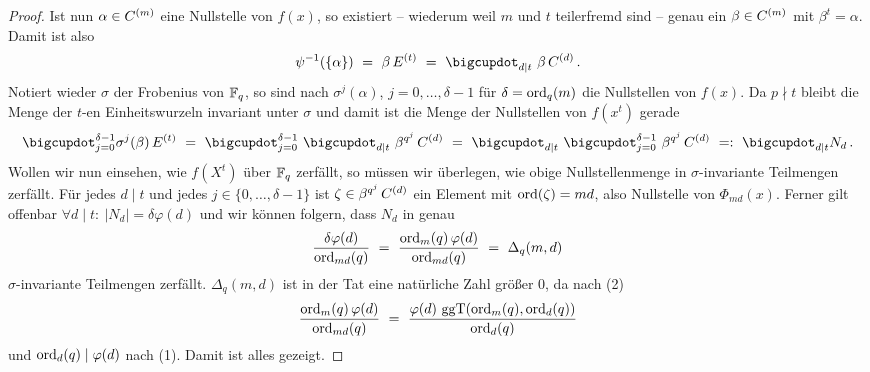 \begin{proof}
  Ist nun $\alpha \in C^{(m)}$ eine Nullstelle von $f(x)$, 
  so existiert -- wiederum
  weil $m$ und $t$ teilerfremd sind -- genau ein $\beta \in C^{(m)}$ mit
  $\beta^t = \alpha$. Damit ist also
  \[ \psi\inv(\{\alpha\}) \speq= \beta\, E\kl t \speq=
    \bigcupdot_{d\mid t}\ \beta\, C\kl d \,.\]
  Notiert wieder $\sigma$ der Frobenius von
  $\mathbb{F}_q$, so sind nach 
  $\sigma^j(\alpha)$, $j=0,\ldots,\delta-1$ für 
  $\delta=\operatorname{ord}_q(m)$ die Nullstellen von $f(x)$. Da $p\nmid t$ bleibt
  die Menge der $t$-en Einheitswurzeln invariant unter $\sigma $ und 
  damit ist die Menge der Nullstellen von $f(x^t)$ gerade
  \[ \bigcupdot_{j=0}^{\delta-1} \sigma^j(\beta)\, E\kl t \speq=
    \bigcupdot_{j=0}^{\delta-1}\ \bigcupdot_{d\mid t}\ \beta^{q^j}\, C\kl d
    \speq=
    \bigcupdot_{d\mid t}\ \bigcupdot_{j=0}^{\delta-1}\ \beta^{q^j}\, C\kl d
    \speq{=:} \bigcupdot_{d\mid t} N_d\,. \]
  Wollen wir nun einsehen, wie $f(X^t)$ über $\mathbb{F}_q$ zerfällt, so müssen wir
  überlegen, wie obige Nullstellenmenge in $\sigma$-invariante Teilmengen
  zerfällt. Für jedes $d\mid t$ und jedes $j\in\{0,\ldots,\delta -1\}$ ist
  $\zeta \in \beta^{q^j}\,C^{(d)}$ ein Element mit $\operatorname{ord}(\zeta) = md$, also
  Nullstelle von $\Phi_{md}(x)$. Ferner gilt
  offenbar $\forall d\mid t:\ |N_d| = \delta\varphi(d)$
  und wir können folgern, dass $N_d$ in genau
  \[ \frac{\delta\varphi(d)}{\operatorname{ord}_{md}(q)} \ =\  \frac{\operatorname{ord}_m(q)\,
    \varphi(d)}{\operatorname{ord}_{md}(q)} \ =\ 
    \Delta_q(m,d)\]
  $\sigma$-invariante Teilmengen zerfällt. $\Delta_q(m,d)$ ist in der Tat eine
  natürliche Zahl größer 0, da nach  (2)
  \[ \frac{\operatorname{ord}_m(q)\,\varphi(d)}{\operatorname{ord}_{md}(q)} \ =\ 
    \frac{\varphi(d)\, \operatorname{ggT}(\operatorname{ord}_m(q),\operatorname{ord}_d(q))}{\operatorname{ord}_d(q)}\]
  und $\operatorname{ord}_d(q) \mid \varphi(d)$ nach  (1).
  Damit ist alles gezeigt.
\end{proof}

